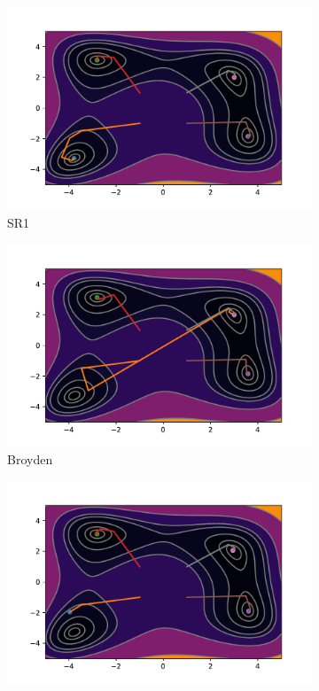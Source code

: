 \begin{figure}[h!]
    \begin{subfigure}{0.5\textwidth}
        \includegraphics[width=\textwidth, trim=1cm 0.5cm 1.3cm 1cm, clip]{assets/SR1/himmelblau.pdf}
        \caption{SR1}
    \end{subfigure}
    \begin{subfigure}{0.5\textwidth}
        \includegraphics[width=\textwidth, trim=1cm 0.5cm 1.3cm 1cm, clip]{assets/Broyden/himmelblau.pdf}
        \caption{Broyden}
    \end{subfigure}
    \begin{subfigure}{0.5\textwidth}
        \includegraphics[width=\textwidth, trim=1cm 0.5cm 1.3cm 1cm, clip]{assets/DFP/himmelblau.pdf}

\end{subfigure}
\end{figure}
